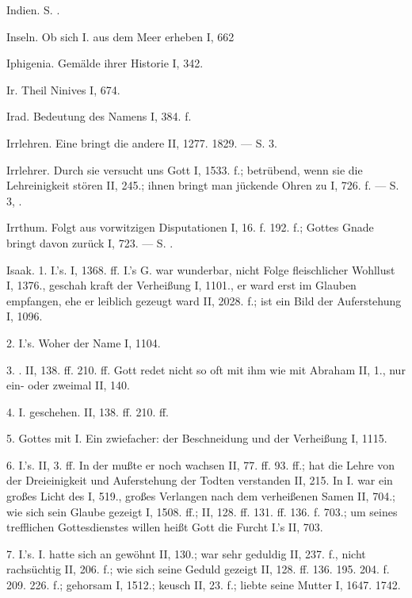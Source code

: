 Indien. S. .

Inseln. Ob sich I. aus dem Meer erheben I, 662

Iphigenia. Gemälde ihrer Historie I, 342.

Ir. Theil Ninives I, 674.

Irad. Bedeutung des Namens I, 384. f.

Irrlehren. Eine bringt die andere II, 1277. 1829. — S.  3.

Irrlehrer. Durch sie versucht uns Gott I, 1533. f.; betrübend, wenn sie die Lehreinigkeit stören II, 245.; ihnen bringt man jückende Ohren zu I, 726. f. — S.  3, .

Irrthum. Folgt aus vorwitzigen Disputationen I, 16. f. 192. f.; Gottes Gnade bringt davon zurück I, 723. — S. .

Isaak. 1.  I.’s. I, 1368. ff. I.’s G. war wunderbar, nicht Folge fleischlicher Wohllust I, 1376., geschah kraft der Verheißung I, 1101., er ward erst im Glauben empfangen, ehe er leiblich gezeugt ward II, 2028. f.; ist ein Bild der Auferstehung I, 1096.

2.  I.’s. Woher der Name I, 1104.

3. . II, 138. ff. 210. ff. Gott redet nicht so oft mit ihm wie mit Abraham II, 1., nur ein- oder zweimal II, 140.

4.  I. geschehen. II, 138. ff. 210. ff.

5.  Gottes mit I. Ein zwiefacher: der Beschneidung und der Verheißung I, 1115.

6.  I.’s. II, 3. ff. In der  mußte er noch wachsen II, 77. ff. 93. ff.; hat die Lehre von der Dreieinigkeit und Auferstehung der Todten verstanden II, 215. In I. war ein großes Licht des  I, 519., großes Verlangen nach dem verheißenen Samen II, 704.; wie sich sein Glaube gezeigt I, 1508. ff.; II, 128. ff. 131. ff. 136. f. 703.; um seines trefflichen Gottesdienstes willen heißt Gott die Furcht I.’s II, 703.

7.  I.’s. I. hatte sich an  gewöhnt II, 130.; war sehr geduldig II, 237. f., nicht rachsüchtig II, 206. f.; wie sich seine Geduld gezeigt II, 128. ff. 136. 195. 204. f. 209. 226. f.; gehorsam I, 1512.; keusch II, 23. f.; liebte seine Mutter I, 1647. 1742.

